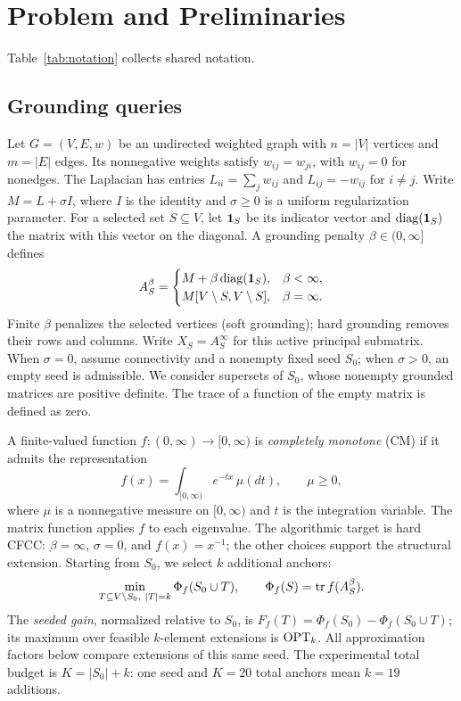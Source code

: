 \section{Problem and Preliminaries}\label{sec:prelim}
Table~\ref{tab:notation} collects shared notation.
\subsection{Grounding queries}
Let $G=(V,E,w)$ be an undirected weighted graph with $n=|V|$
vertices and $m=|E|$ edges. Its nonnegative weights satisfy
$w_{ij}=w_{ji}$, with $w_{ij}=0$ for nonedges. The Laplacian has
entries $L_{ii}=\sum_jw_{ij}$ and $L_{ij}=-w_{ij}$ for $i\ne j$.
Write $M=L+\sigma I$, where $I$ is the identity and $\sigma\geq0$
is a uniform regularization parameter. For a selected set $S\subseteq V$,
let $\mathbf 1_S$ be its indicator vector and $\operatorname{diag}(\mathbf 1_S)$ the
matrix with this vector on the diagonal. A grounding penalty
$\beta\in(0,\infty]$ defines
\begin{equation}\label{eq:mainmatrices}
 A_S^\beta=
 \begin{cases}M+\beta\operatorname{diag}(\mathbf 1_S),&\beta<\infty,\\
 M[V\setminus S,V\setminus S],&\beta=\infty.
 \end{cases}
\end{equation}
Finite $\beta$ penalizes the selected vertices (soft grounding);
hard grounding removes their rows and columns. Write
$X_S=A_S^\infty$ for this active principal submatrix.
When $\sigma=0$, assume connectivity and a nonempty fixed seed
$S_0$; when $\sigma>0$, an empty seed is admissible.
We consider supersets of $S_0$, whose nonempty grounded matrices
are positive definite. The trace of a function of the empty matrix
is defined as zero.

A finite-valued function $f:(0,\infty)\to[0,\infty)$ is
\emph{completely monotone} (CM) if it admits the representation
\begin{equation}\label{eq:maincmrep}
 f(x)=\int_{[0,\infty)}e^{-tx}\,\mu(dt),\qquad \mu\geq0,
\end{equation}
where $\mu$ is a nonnegative measure on $[0,\infty)$ and $t$
is the integration variable. The matrix function applies $f$ to
each eigenvalue. The algorithmic target is hard CFCC:
$\beta=\infty$, $\sigma=0$, and $f(x)=x^{-1}$; the other
choices support the structural extension. Starting from $S_0$,
we select $k$ additional anchors:
\begin{equation}\label{eq:mainquery}
 \min_{T\subseteq V\setminus S_0,\ |T|=k}\Phi_f(S_0\cup T),
 \qquad \Phi_f(S)=\operatorname{tr} f(A_S^\beta).
\end{equation}
The \emph{seeded gain}, normalized relative to $S_0$, is
$F_f(T)=\Phi_f(S_0)-\Phi_f(S_0\cup T)$; its maximum over feasible
$k$-element extensions is $\mathrm{OPT}_k$. All approximation factors below
compare extensions of this same seed. The experimental total budget
is $K=|S_0|+k$: one seed and $K=20$ total anchors mean $k=19$
additions.

